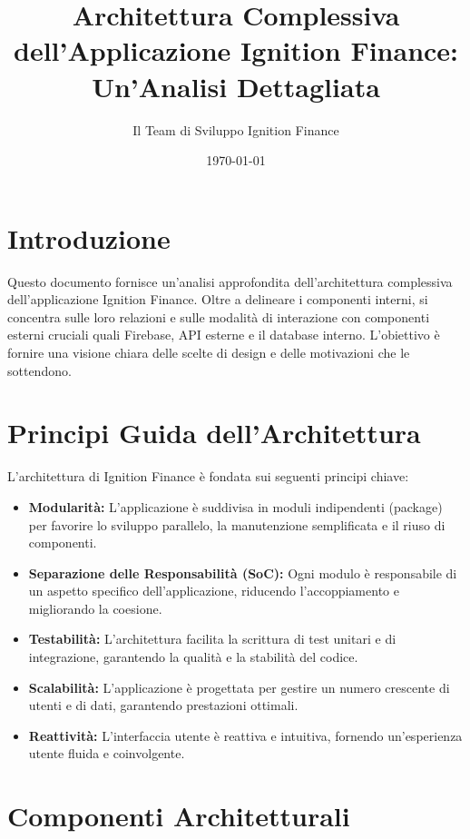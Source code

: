 \documentclass{article}
\title{Architettura Complessiva dell'Applicazione Ignition Finance: Un'Analisi Dettagliata}
\author{Il Team di Sviluppo Ignition Finance}
\date{\today}
\begin{document}
\maketitle

\section{Introduzione}

Questo documento fornisce un'analisi approfondita dell'architettura complessiva dell'applicazione Ignition Finance. Oltre a delineare i componenti interni, si concentra sulle loro relazioni e sulle modalità di interazione con componenti esterni cruciali quali Firebase, API esterne e il database interno. L'obiettivo è fornire una visione chiara delle scelte di design e delle motivazioni che le sottendono.

\section{Principi Guida dell'Architettura}

L'architettura di Ignition Finance è fondata sui seguenti principi chiave:

\begin{itemize}
    \item \textbf{Modularità:} L'applicazione è suddivisa in moduli indipendenti (package) per favorire lo sviluppo parallelo, la manutenzione semplificata e il riuso di componenti.
    \item \textbf{Separazione delle Responsabilità (SoC):} Ogni modulo è responsabile di un aspetto specifico dell'applicazione, riducendo l'accoppiamento e migliorando la coesione.
    \item \textbf{Testabilità:} L'architettura facilita la scrittura di test unitari e di integrazione, garantendo la qualità e la stabilità del codice.
    \item \textbf{Scalabilità:} L'applicazione è progettata per gestire un numero crescente di utenti e di dati, garantendo prestazioni ottimali.
    \item \textbf{Reattività:} L'interfaccia utente è reattiva e intuitiva, fornendo un'esperienza utente fluida e coinvolgente.
\end{itemize}

\section{Componenti Architetturali}
\end{document}
